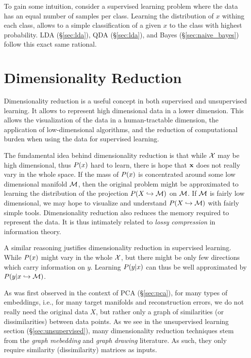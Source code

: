 To gain some intuition, consider a supervised learning problem where the data has an equal number of samples per class. 
Learning the distribution of $x$ withing each class, allows to a simple classification of a given $x$ to the class with highest probability. LDA (\S\ref{sec:lda}), QDA (\S\ref{sec:lda}), and \Naive Bayes (\S\ref{sec:naive_bayes}) follow this exact same rational.





\chapter{Dimensionality Reduction}
\label{apx:dim_reduce}

Dimensionality reduction is a useful concept in both supervised and unsupervised learning. 
It allows to represent high dimensional data in a lower dimension. This allows the visualization of the data in a human-tractable dimension, the application of low-dimensional algorithms, and the reduction of computational burden when using the data for supervised learning. 

The fundamental idea behind dimensionality reduction is that while $\mathcal{X}$ may be high dimensional, thus $P(x)$ hard to learn, there is hope that $\mathbf{x}$ does not really vary in the whole space. 
If the mass of $P(x)$ is concentrated around some low dimensional manifold $\mathcal{M}$, then the original problem might be approximated to learning the distribution of the projection $P(X \hookrightarrow \mathcal{M})$ on $\mathcal{M}$. 
If $\mathcal{M}$ is fairly low dimensional, we may hope to visualize and understand $P(X \hookrightarrow \mathcal{M})$ with fairly simple tools.
Dimensionality reduction also reduces the memory required to represent the data. It is thus intimately related to \emph{lossy compression} in information theory.

A similar reasoning justifies dimensionality reduction in supervised learning. 
While $P(x)$ might vary in the whole $\mathcal{X}$, but there might be only few directions which carry information on $y$. Learning $P(y|x)$ can thus be well approximated by $P(y|x \hookrightarrow \mathcal{M})$.

As was first observed in the context of PCA (\S\ref{sec:pca}), for many types of embeddings, i.e., for many target manifolds and reconstruction errors, we do not really need the original data $X$, but rather only a graph of similarities (or dissimilarities) between data points. 
As we see in the unsupervised learning section (\S\ref{sec:unsupervised}), many dimensionality reduction techniques stem from the \emph{graph mebedding} and \emph{graph drawing} literature. As such, they only require similarity (dissimilarity) matrices as inputs. 


